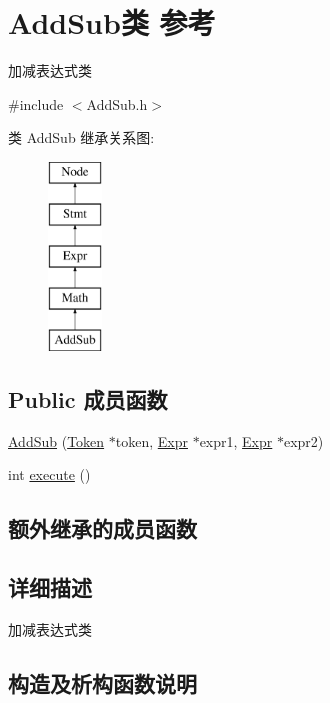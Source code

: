 \hypertarget{class_add_sub}{}\section{Add\+Sub类 参考}
\label{class_add_sub}


加减表达式类  




{\ttfamily \#include $<$Add\+Sub.\+h$>$}

类 Add\+Sub 继承关系图\+:\begin{figure}[H]
\begin{center}
\leavevmode
\includegraphics[height=5.000000cm]{class_add_sub}
\end{center}
\end{figure}
\subsection*{Public 成员函数}
\begin{DoxyCompactItemize}
\item 
\hyperlink{class_add_sub_af090ec4bb8a06ee586c4bfa8f4bad3ef}{Add\+Sub} (\hyperlink{class_token}{Token} $\ast$token, \hyperlink{class_expr}{Expr} $\ast$expr1, \hyperlink{class_expr}{Expr} $\ast$expr2)
\item 
int \hyperlink{class_add_sub_a73c0513a31a5400fdfc79ce877a1c3b9}{execute} ()
\end{DoxyCompactItemize}
\subsection*{额外继承的成员函数}


\subsection{详细描述}
加减表达式类 

\subsection{构造及析构函数说明}
\mbox{\label{class_add_sub_af090ec4bb8a06ee586c4bfa8f4bad3ef}} 
